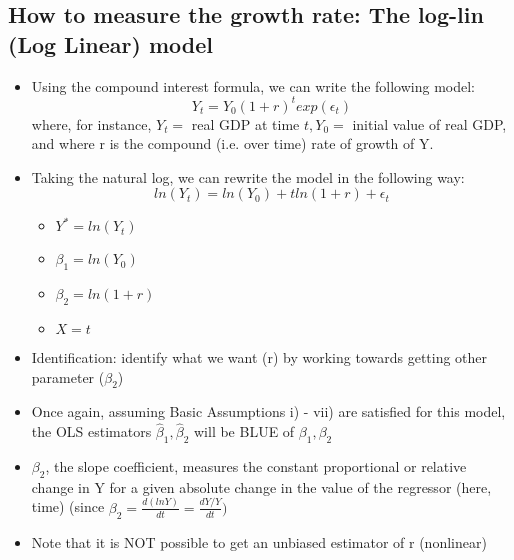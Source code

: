 \documentclass[10pt, oneside]{article}
\begin{document}
\subsection{How to measure the growth rate: The log-lin (Log Linear) model}
\begin{itemize}
    \item Using the compound interest formula, we can write the following model: \[Y_t = Y_0 (1+r)^t exp(\epsilon_t)\] where, for instance, $Y_t = $ real GDP at time $t, Y_0 = $ initial value of real GDP, and where r is the compound (i.e. over time) rate of growth of Y.
    \item Taking the natural log, we can rewrite the model in the following way: \[ln(Y_t) = ln(Y_0) + tln(1+r) + \epsilon_t\]
    \begin{itemize}
        \item $Y^*=ln(Y_t)$
        \item $\beta_1 = ln(Y_0)$
        \item $\beta_2 = ln(1+r)$
        \item $X = t$
    \end{itemize}
    \item Identification: identify what we want (r) by working towards getting other parameter ($\beta_2$)
    \item Once again, assuming Basic Assumptions i) - vii) are satisfied for this model, the OLS estimators $\hat \beta_1, \hat \beta_2$ will be BLUE of $\beta_1, \beta_2$
    \item $\beta_2$, the slope coefficient, measures the constant proportional or relative change in Y for a given absolute change in the value of the regressor (here, time) (since $\beta_2 = \frac{d(lnY)}{dt} = \frac{dY/Y}{dt})$
    \item Note that it is NOT possible to get an unbiased estimator of r (nonlinear)
\end{itemize}
\end{document}
